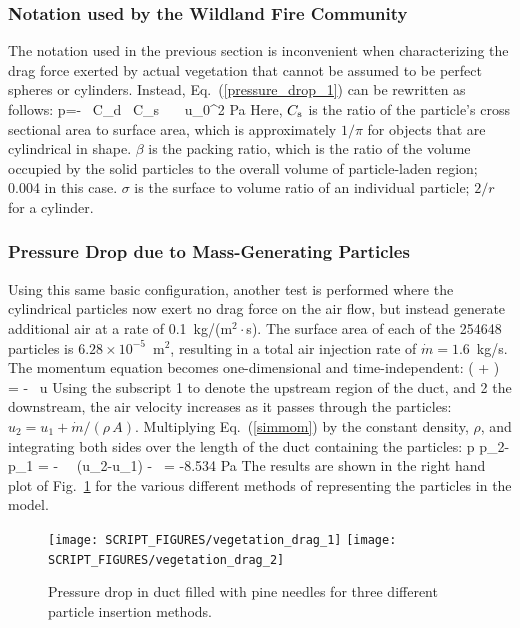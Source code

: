 \documentclass[11pt]{book}
\begin{document}
\subsubsection{Notation used by the Wildland Fire Community}

The notation used in the previous section is inconvenient when characterizing the drag force exerted by actual vegetation that cannot be assumed to be perfect spheres or cylinders. Instead, Eq.~(\ref{pressure_drop_1}) can be rewritten as follows:
\be
   \Delta p=- \rho \, C_{\rm d} \, C_{\rm s} \, \beta \, \sigma \, u_0^2  \; {\rm Pa}  \label{pressure_drop_2}
\ee
Here, $C_{\rm s}$ is the ratio of the particle's cross sectional area to surface area, which is approximately $1/\pi$ for objects that are cylindrical in shape. $\beta$ is the packing ratio, which is the ratio of the volume occupied by the solid particles to the overall volume of particle-laden region; 0.004 in this case. $\sigma$ is the surface to volume ratio of an individual particle; $2/r$ for a cylinder.

\subsubsection{Pressure Drop due to Mass-Generating Particles}

Using this same basic configuration, another test is performed where the cylindrical particles now exert no drag force on the air flow, but instead generate additional air at a rate of 0.1~kg/(m$^2 \cdot$s). The surface area of each of the 254648 particles is $6.28 \times 10^{-5}$~m$^2$, resulting in a total air injection rate of $\dot{m}=1.6$~kg/s. The momentum equation becomes one-dimensional and time-independent:
\be
    \left(  +  \right) = -   \, u  \label{simmom}
\ee
Using the subscript 1 to denote the upstream region of the duct, and 2 the downstream, the air velocity increases as it passes through the particles: $u_2=u_1+\dot{m}/(\rho \, A)$. Multiplying Eq.~(\ref{simmom}) by the constant density, $\rho$, and integrating both sides over the length of the duct containing the particles:
\be
   \Delta p \equiv p_2-p_1 =  - \rho \,  \, (u_2-u_1) -  \,  = -8.534  \; {\rm Pa}
\ee
The results are shown in the right hand plot of Fig.~\ref{vegetation_drag_fig} for the various different methods of representing the particles in the model.

\begin{figure}[ht]
\texttt{[image: SCRIPT\_FIGURES/vegetation\_drag\_1]}
\texttt{[image: SCRIPT\_FIGURES/vegetation\_drag\_2]}
\caption[The {\ct vegetation\_drag} test cases]{Pressure drop in duct filled with pine needles for three different particle insertion methods.}
\label{vegetation_drag_fig}
\end{figure}
\end{document}
